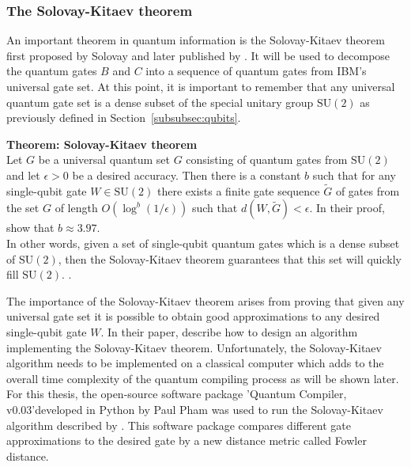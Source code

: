 \subsubsection{The Solovay-Kitaev theorem}
\label{subsubsubsec:solovaykitaev}

An important theorem in quantum information is the Solovay-Kitaev theorem first proposed by Solovay and later published by . It will be used to decompose the quantum gates $B$ and $C$ into a sequence of quantum gates from IBM's universal gate set. At this point, it is important to remember that any universal quantum gate set is a dense subset of the special unitary group $\mathrm{SU}(2)$ as previously defined in Section~\ref{subsubsec:qubits}.
\vspace{0.3cm}
\begin{redbox}
\textbf{Theorem: Solovay-Kitaev theorem}\\
\newline
Let $G$ be a universal quantum set $G$ consisting of quantum gates from $\mathrm{SU}(2)$ and let $\epsilon > 0$ be a desired accuracy. Then there is a constant $b$ such that for any single-qubit gate $W \in \mathrm{SU}(2)$ there exists a
finite gate sequence $\tilde{G}$ of gates from the set $G$ of length $O(\log^b (1/\epsilon))$ such that $d(W, \tilde{G}) < \epsilon$. In their proof,  show that $b \approx 3.97$.\\
\newline
In other words, given a set of single-qubit quantum gates which is a dense subset of $\mathrm{SU}(2)$, then the Solovay-Kitaev theorem guarantees that this set will quickly fill $\mathrm{SU}(2)$.
\cite{dawson2005solovay}.
\end{redbox}
The importance of the Solovay-Kitaev theorem arises from proving that given any universal gate set it is possible to obtain good approximations to any desired single-qubit gate $W$. In their paper,  describe how to design an algorithm implementing the Solovay-Kitaev theorem. Unfortunately, the Solovay-Kitaev algorithm needs to be implemented on a classical computer which adds to the overall time complexity of the quantum compiling process as will be shown later. For this thesis, the open-source software package 'Quantum Compiler, v0.03'\footnotemark[16] developed in Python by Paul Pham was used to run the Solovay-Kitaev algorithm described by . This software package compares different gate approximations to the desired gate by a new distance metric called Fowler distance.

